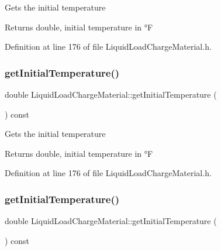 Gets the initial temperature \begin{DoxyReturn}{Returns}
double, initial temperature in °F 
\end{DoxyReturn}


Definition at line 176 of file Liquid\+Load\+Charge\+Material.\+h.

\mbox{\label{class_liquid_load_charge_material_ab80229a78f884fb07e756665a616d401}} 
\subsubsection{\texorpdfstring{get\+Initial\+Temperature()}{getInitialTemperature()}\hspace{0.1cm}{\footnotesize\ttfamily [2/3]}}
{\footnotesize\ttfamily double Liquid\+Load\+Charge\+Material\+::get\+Initial\+Temperature (\begin{DoxyParamCaption}{ }\end{DoxyParamCaption}) const\hspace{0.3cm}{\ttfamily [inline]}}

Gets the initial temperature \begin{DoxyReturn}{Returns}
double, initial temperature in °F 
\end{DoxyReturn}


Definition at line 176 of file Liquid\+Load\+Charge\+Material.\+h.

\mbox{\label{class_liquid_load_charge_material_ab80229a78f884fb07e756665a616d401}} 
\subsubsection{\texorpdfstring{get\+Initial\+Temperature()}{getInitialTemperature()}\hspace{0.1cm}{\footnotesize\ttfamily [3/3]}}
{\footnotesize\ttfamily double Liquid\+Load\+Charge\+Material\+::get\+Initial\+Temperature (\begin{DoxyParamCaption}{ }\end{DoxyParamCaption}) const\hspace{0.3cm}{\ttfamily [inline]}}

